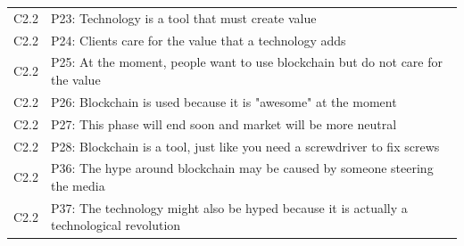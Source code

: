 \begin{table}[H]
\begin{tabularx}{\textwidth}{l|X}
	C2.2 & P23: Technology is a tool that must create value \\  
	C2.2 & P24: Clients care for the value that a technology adds \\  
	C2.2 & P25: At the moment, people want to use blockchain but do not care for the value \\  
	C2.2 & P26: Blockchain is used because it is "awesome" at the moment \\  
	C2.2 & P27: This phase will end soon and market will be more neutral \\  
	C2.2 & P28: Blockchain is a tool, just like you need a screwdriver to fix screws \\  
	C2.2 & P36: The hype around blockchain may be caused by someone steering the media \\  
	C2.2 & P37: The technology might also be hyped because it is actually a technological revolution \\ 
    \end{tabularx}
\end{table}

